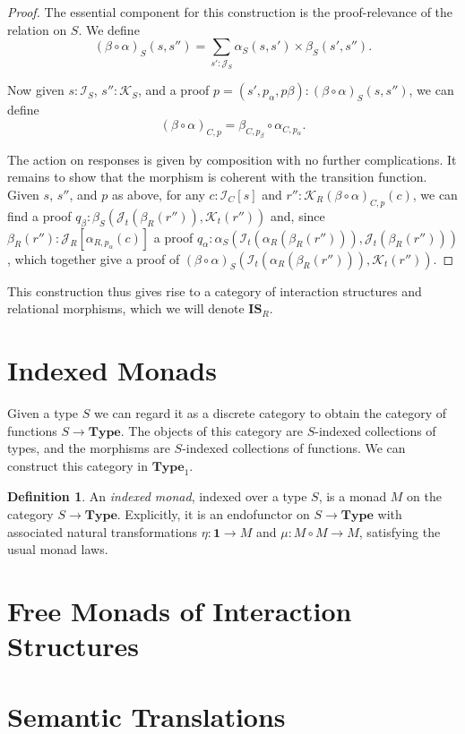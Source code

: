 \documentclass{article}
\theoremstyle{definition}
\newtheorem{definition}[theorem]{Definition}
\newcommand{\iss}[1]{\mathcal{#1}_S}
\newcommand{\isc}[1]{\mathcal{#1}_C}
\newcommand{\isr}[1]{\mathcal{#1}_R}
\newcommand{\ist}[1]{\mathcal{#1}_t}
\begin{document}
    \begin{proof}
        The essential component for this construction is the proof-relevance of the relation on $S$.  We define
        \[
            (\beta \circ \alpha)_S(s, s'') = \sum_{s' : \iss J} \alpha_S(s, s') \times \beta_S(s', s'').
        \]

        Now given $s : \iss I$, $s'' : \iss K$, and a proof $p = (s', p_\alpha, p\beta) : (\beta \circ \alpha)_S(s, s'')$,
        we can define
        \[
            (\beta \circ \alpha)_{C, p} = \beta_{C, p_\beta} \circ \alpha_{C, p_\alpha}.
        \]

        The action on responses is given by composition with no further complications.  It remains to show that the
        morphism is coherent with the transition function.  Given $s$, $s''$, and $p$ as above, for any $c : \isc I[s]$
        and $r'' : \isr K{(\beta \circ \alpha)_{C, p}(c)}$, we can find a proof $q_\beta : \beta_S(\ist J(\beta_R(r'')),
        \ist K(r''))$ and, since $\beta_R(r'') : \isr J[\alpha_{R, p_\alpha}(c)]$ a proof $q_\alpha :
        \alpha_S(\ist I(\alpha_R(\beta_R(r''))), \ist J(\beta_R(r'')))$, which together give a proof of $(\beta \circ
        \alpha)_S(\ist I(\alpha_R(\beta_R(r''))), \ist K(r''))$.
    \end{proof}

    This construction thus gives rise to a category of interaction structures and relational morphisms, which we will
    denote $\mathbf{IS}_R$.

    \section{Indexed Monads}

    Given a type $S$ we can regard it as a discrete category to obtain the category of functions $S \to \mathbf{Type}$.
    The objects of this category are $S$-indexed collections of types, and the morphisms are $S$-indexed collections of
    functions.  We can construct this category in $\mathbf{Type}_1$.

    \begin{definition}
        An \emph{indexed monad}, indexed over a type $S$, is a monad $M$ on the category $S \to \mathbf{Type}$.
        Explicitly, it is an endofunctor on $S \to \mathbf{Type}$ with associated natural transformations $\eta :
        \mathbf{1} \to M$ and $\mu : M \circ M \to M$, satisfying the usual monad laws.
    \end{definition}

    \section{Free Monads of Interaction Structures}

    \section{Semantic Translations}
\end{document}
